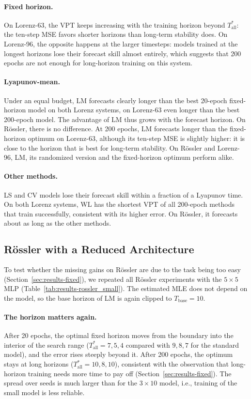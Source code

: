 \documentclass{article}
\begin{document}
\paragraph{Fixed horizon.}
On Lorenz-63, the VPT keeps increasing with the training horizon beyond $T^*_{\mathrm{all}}$: the ten-step MSE favors shorter horizons than long-term stability does. On Lorenz-96, the opposite happens at the larger timesteps: models trained at the longest horizons lose their forecast skill almost entirely, which suggests that 200 epochs are not enough for long-horizon training on this system.

\paragraph{Lyapunov-mean.}
Under an equal budget, LM forecasts clearly longer than the best 20-epoch fixed-horizon model on both Lorenz systems, on Lorenz-63 even longer than the best 200-epoch model. The advantage of LM thus grows with the forecast horizon. On Rössler, there is no difference. At 200 epochs, LM forecasts longer than the fixed-horizon optimum on Lorenz-63, although its ten-step MSE is slightly higher: it is close to the horizon that is best for long-term stability. On Rössler and Lorenz-96, LM, its randomized version and the fixed-horizon optimum perform alike.

\paragraph{Other methods.}
LS and CV models lose their forecast skill within a fraction of a Lyapunov time. On both Lorenz systems, WL has the shortest VPT of all 200-epoch methods that train successfully, consistent with its higher error. On Rössler, it forecasts about as long as the other methods.

\subsection{Rössler with a Reduced Architecture}
\label{sec:results-rossler-small}

To test whether the missing gains on Rössler are due to the task being too easy (Section~\ref{sec:results-fixed}), we repeated all Rössler experiments with the $5 \times 5$ MLP (Table~\ref{tab:results-rossler_small}). The estimated MLE does not depend on the model, so the base horizon of LM is again clipped to $T_{\mathrm{base}} = 10$.

\paragraph{The horizon matters again.}
After 20 epochs, the optimal fixed horizon moves from the boundary into the interior of the search range ($T^*_{\mathrm{all}} = 7, 5, 4$ compared with $9, 8, 7$ for the standard model), and the error rises steeply beyond it. After 200 epochs, the optimum stays at long horizons ($T^*_{\mathrm{all}} = 10, 8, 10$), consistent with the observation that long-horizon training needs more time to pay off (Section~\ref{sec:results-fixed}). The spread over seeds is much larger than for the $3 \times 10$ model, i.e., training of the small model is less reliable.
\end{document}
